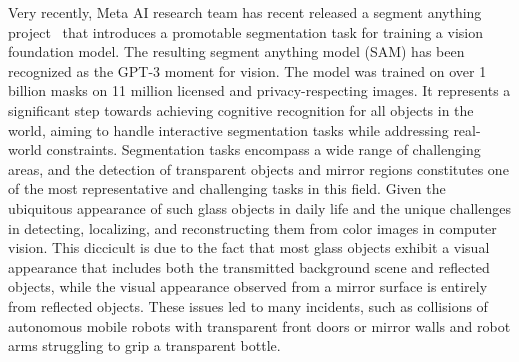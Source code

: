 \documentclass{article}
\begin{document}
Very recently, Meta AI research team has recent released a segment anything project~\cite {kirillov2023segment} that introduces a promotable segmentation task for training a vision foundation model. The resulting segment anything model (SAM) has been recognized as the GPT-3 moment for vision. The model was trained on over 1 billion masks on 11 million licensed and privacy-respecting images. 
It represents a significant step towards achieving cognitive recognition for all objects in the world, aiming to handle interactive segmentation tasks while addressing real-world constraints. %
Segmentation tasks encompass a wide range of challenging areas, and the detection of transparent objects and mirror regions constitutes one of the most representative and challenging tasks in this field. Given the ubiquitous appearance of such glass objects in daily life and the unique challenges in detecting, localizing, and reconstructing them from color images in computer vision\citep{lin2021rich}. This diccicult is due to the fact that most glass objects exhibit a visual appearance that includes both the transmitted background scene and reflected objects\citep{maeno2013light}\citep{he2021enhanced}, while the visual appearance observed from a mirror surface is entirely from reflected objects. These issues led to many incidents, such as collisions of autonomous mobile robots with transparent front doors or mirror walls and robot arms struggling to grip a transparent bottle.

\end{document}
